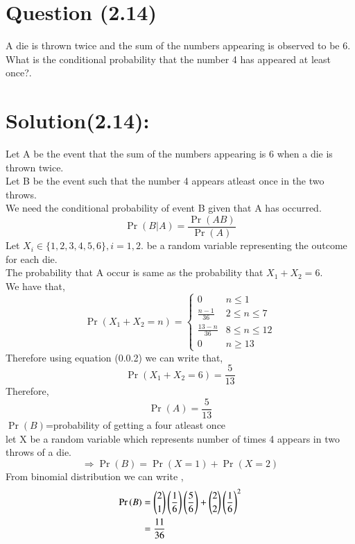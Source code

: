 \documentclass[journal,12pt,twocolumn]{IEEEtran}
\begin{document}
\section*{Question (2.14)}
A die is thrown twice and the sum of the numbers appearing is observed to be 6. What is the conditional probability that the number 4 has appeared at least once?.
\section*{Solution(2.14):}
Let A be the event that the sum of the numbers appearing is 6 when a die is thrown twice.\\
Let B be the event such that the number 4 appears atleast once in the two throws.\\
We need the conditional probability of event B given that A has occurred.\\ 
\begin{equation}
    \Pr{(B|A)}=\frac{\Pr{(AB)}}{\Pr{(A)}}
\end{equation}
Let $X_i \in \{1,2,3,4,5,6\},i = 1,2.$ be a random variable representing the outcome for each die.\\
The probability that A occur is same as the probability that $X_1 +X_2 =6$.\\
We have that,\\
\begin{equation}
\Pr{(X_1 +X_2=n)}=
\begin{cases}
    0 & n \leq 1\\
    \frac{n-1}{36} & 2\leq n \leq 7\\
    \frac{13-n}{36} & 8 \leq n \leq 12\\
    0 & n \geq 13
\end{cases}
\end{equation}
Therefore using equation (0.0.2) we can write that,
\begin{equation}
    \Pr{(X_1+X_2=6)}=\frac{5}{13}
\end{equation}
Therefore,
\begin{equation}
    \Pr(A)=\frac{5}{13}
\end{equation}
    $\Pr{(B)}$=probability of getting a four atleast once\\
let X be a random variable which represents number of times 4 appears in two throws of a die.\\
\begin{equation}
    \Rightarrow \Pr{(B)}=\Pr{(X=1)}+\Pr{(X=2)}
\end{equation}
From binomial distribution we can write ,
\begin{align}
    \Pr{(B)}&= \binom{2}{1} \left(\frac{1}{6}\right)\left(\frac{5}{6}\right)+\binom{2}{2} \left(\frac{1}{6}\right)^2\\
    &=\frac{11}{36}
\end{align}
\end{document}
